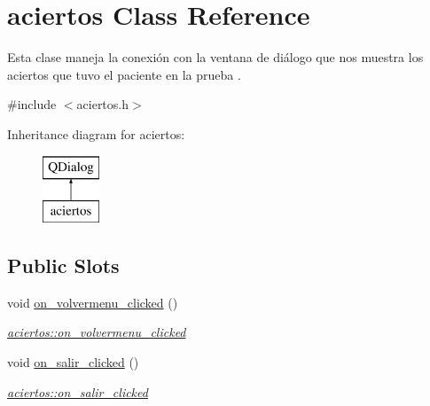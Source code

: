 \hypertarget{classaciertos}{}\section{aciertos Class Reference}
\label{classaciertos}


Esta clase maneja la conexión con la ventana de diálogo que nos muestra los aciertos que tuvo el paciente en la prueba .  




{\ttfamily \#include $<$aciertos.\+h$>$}

Inheritance diagram for aciertos\+:\begin{figure}[H]
\begin{center}
\leavevmode
\includegraphics[height=2.000000cm]{classaciertos}
\end{center}
\end{figure}
\subsection*{Public Slots}
\begin{DoxyCompactItemize}
\item 
void \hyperlink{classaciertos_aae3c1efb76360acfff0e058b6ba6ec33}{on\+\_\+volvermenu\+\_\+clicked} ()
\begin{DoxyCompactList}\small\item\em \hyperlink{classaciertos_aae3c1efb76360acfff0e058b6ba6ec33}{aciertos\+::on\+\_\+volvermenu\+\_\+clicked} \end{DoxyCompactList}\item 
void \hyperlink{classaciertos_a1b36eb2a2c3fef95390943d8dacf915d}{on\+\_\+salir\+\_\+clicked} ()
\begin{DoxyCompactList}\small\item\em \hyperlink{classaciertos_a1b36eb2a2c3fef95390943d8dacf915d}{aciertos\+::on\+\_\+salir\+\_\+clicked} \end{DoxyCompactList}\end{DoxyCompactItemize}
